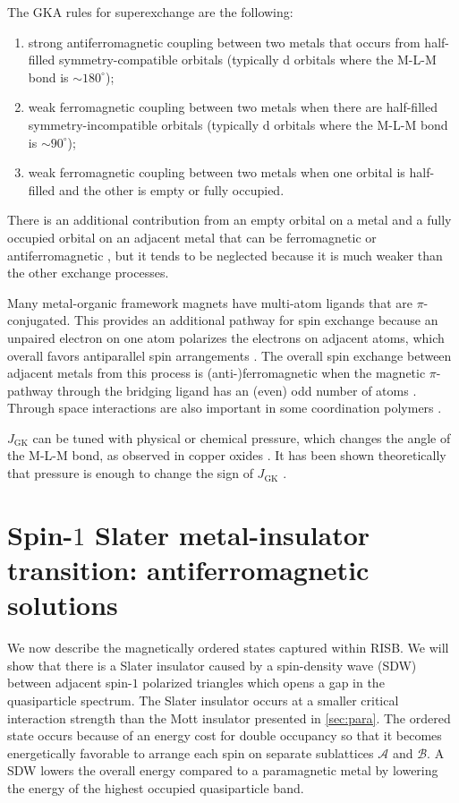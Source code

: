 \documentclass[reprint,aps,prb,amsmath,amssymb]{revtex4-2}
\begin{document}
The GKA rules for superexchange are the following:
\renewcommand{\labelenumi}{\roman{enumi}.}
\begin{enumerate} [nosep]
	\item strong antiferromagnetic coupling between two metals that occurs from half-filled symmetry-compatible orbitals (typically d orbitals where the M-L-M bond is $\sim \! 180^{\circ}$);
	\item weak ferromagnetic coupling between two metals when there are half-filled symmetry-incompatible orbitals (typically d orbitals where the M-L-M bond is $\sim \! 90^{\circ}$);
	\item weak ferromagnetic coupling between two metals when one orbital is half-filled and the other is empty or fully occupied.
\end{enumerate}
%
There is an additional contribution from an empty orbital on a metal and a fully occupied orbital on an adjacent metal that can be ferromagnetic \cite{Anderson1963,Weihe2000} or antiferromagnetic \cite{Weihe1997}, but it tends to be neglected because it is much weaker than the other exchange processes.

Many metal-organic framework magnets have multi-atom ligands that are $\pi$-conjugated. This provides an additional pathway for spin exchange because an unpaired electron on one atom polarizes the electrons on adjacent atoms, which overall favors antiparallel spin arrangements \cite{Thorarinsdottir2020}. The overall spin exchange between adjacent metals from this process is (anti-)ferromagnetic when the magnetic $\pi$-pathway through the bridging ligand has an (even) odd number of atoms \cite{Thorarinsdottir2020}. Through space interactions are also important in some coordination polymers \cite{Kenny2021}.

$J_{\mathrm{GK}}$ can be tuned with physical or chemical pressure, which changes the angle of the M-L-M bond, as observed in copper oxides \cite{Mizuno1998,Shimizu2003}. It has been shown theoretically that pressure is enough to change the sign of $J_{\mathrm{GK}}$ \cite{Rocquefelte2012}.

\section{Spin-$1$ Slater metal-insulator transition: antiferromagnetic solutions} \label{sec:afm}

We now describe the magnetically ordered states captured within RISB. We will show that there is a Slater insulator \cite{Slater1951} caused by a spin-density wave (SDW) between adjacent spin-$1$ polarized triangles which opens a gap in the quasiparticle spectrum. The Slater insulator occurs at a smaller critical interaction strength than the Mott insulator presented in \cref{sec:para}. The ordered state occurs because of an energy cost for double occupancy so that it becomes energetically favorable to arrange each spin on separate sublattices $\mathcal{A}$ and $\mathcal{B}$. A SDW lowers the overall energy compared to a paramagnetic metal by lowering the energy of the highest occupied quasiparticle band.
\end{document}

